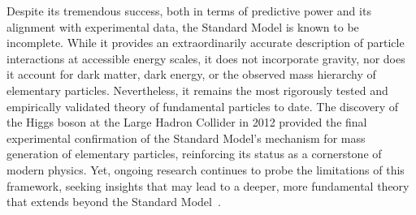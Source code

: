 Despite its tremendous success, both in terms of predictive power and its alignment with experimental data, the Standard Model is known to be incomplete. While it provides an extraordinarily accurate description of particle interactions at accessible energy scales, it does not incorporate gravity, nor does it account for dark matter, dark energy, or the observed mass hierarchy of elementary particles. Nevertheless, it remains the most rigorously tested and empirically validated theory of fundamental particles to date. The discovery of the Higgs boson at the Large Hadron Collider in 2012 provided the final experimental confirmation of the Standard Model’s mechanism for mass generation of elementary particles, reinforcing its status as a cornerstone of modern physics. Yet, ongoing research continues to probe the limitations of this framework, seeking insights that may lead to a deeper, more fundamental theory that extends beyond the Standard Model~\cite{TheStand35}.











